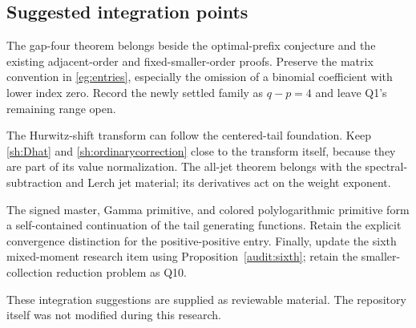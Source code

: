 \documentclass[11pt]{article}
\theoremstyle{definition}
\theoremstyle{remark}
\numberwithin{equation}{section}
\begin{document}
\subsection{Suggested integration points}

The gap-four theorem belongs beside the optimal-prefix conjecture and
the existing adjacent-order and fixed-smaller-order proofs. Preserve
the matrix convention in \eqref{eg:entries}, especially the omission
of a binomial coefficient with lower index zero. Record the newly
settled family as $q-p=4$ and leave Q1's remaining range open.

The Hurwitz-shift transform can follow the centered-tail foundation.
Keep \eqref{sh:Dhat} and \eqref{sh:ordinarycorrection} close to the
transform itself, because they are part of its value normalization.
The all-jet theorem belongs with the spectral-subtraction and Lerch
jet material; its derivatives act on the weight exponent.

The signed master, Gamma primitive, and colored polylogarithmic
primitive form a self-contained continuation of the tail generating
functions. Retain the explicit convergence distinction for the
positive-positive entry. Finally, update the sixth mixed-moment
research item using Proposition~\ref{audit:sixth}; retain the
smaller-collection reduction problem as Q10.

These integration suggestions are supplied as reviewable material.
The repository itself was not modified during this research.

\end{document}

